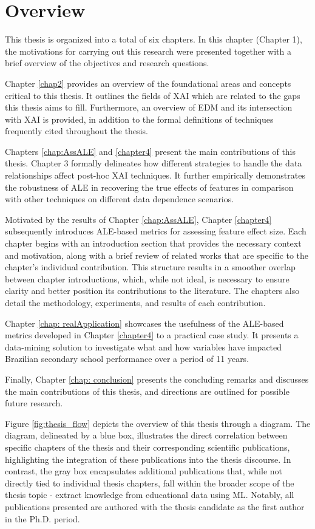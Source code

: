 \section{Overview}
\label{overview}

This thesis is organized into a total of six chapters. In this chapter (Chapter 1), the motivations for carrying out this research were presented together with a brief overview of the objectives and research questions.

Chapter \ref{chap2} provides an overview of the foundational areas and concepts critical to this thesis. It outlines the fields of XAI which are related to the gaps this thesis aims to fill. Furthermore, an overview of EDM and its intersection with XAI is provided, in addition to the formal definitions of techniques frequently cited throughout the thesis. 

Chapters \ref{chap:AssALE} and \ref{chapter4} present the main contributions of this thesis. Chapter 3 formally delineates how different strategies to handle the data relationships affect post-hoc XAI techniques. It further empirically demonstrates the robustness of ALE in recovering the true effects of features in comparison with other techniques on different data dependence scenarios. 

Motivated by the results of Chapter \ref{chap:AssALE}, Chapter \ref{chapter4} subsequently introduces ALE-based metrics for assessing feature effect size. Each chapter begins with an introduction section that provides the necessary context and motivation, along with a brief review of related works that are specific to the chapter’s individual contribution. This structure results in a smoother overlap between chapter introductions, which, while not ideal, is necessary to ensure clarity and better position its contributions to the literature. The chapters also detail the methodology, experiments, and results of each contribution. 

Chapter \ref{chap: realApplication} showcases the usefulness of the ALE-based metrics developed in Chapter \ref{chapter4} to a practical case study. It presents a data-mining solution to investigate what and how variables have impacted Brazilian secondary school performance over a period of 11 years. 

Finally, Chapter \ref{chap: conclusion} presents the concluding remarks and discusses the main contributions of this thesis, and directions are outlined for possible future research.

Figure \ref{fig:thesis_flow} depicts the overview of this thesis through a diagram. The diagram, delineated by a blue box, illustrates the direct correlation between specific chapters of the thesis and their corresponding scientific publications, highlighting the integration of these publications into the thesis discourse. In contrast, the gray box encapsulates additional publications that, while not directly tied to individual thesis chapters, fall within the broader scope of the thesis topic - extract knowledge from educational data using ML. Notably, all publications presented are authored with the thesis candidate as the first author in the Ph.D. period.


